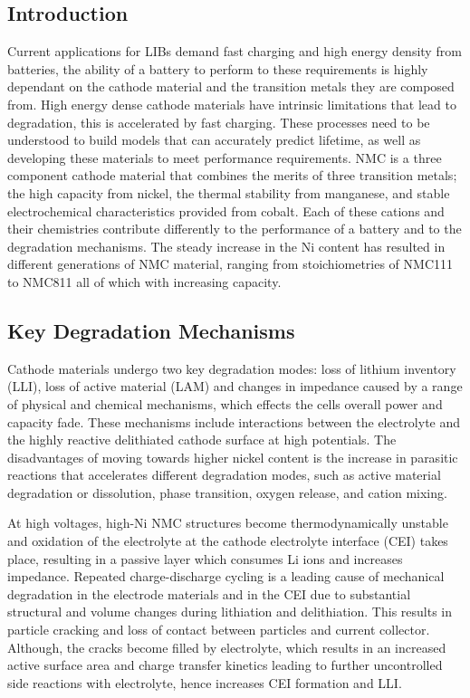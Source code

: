 \documentclass[aps,prb,twocolumn,superscriptaddress,reprint]{revtex4-1}
\begin{document}
\subsection{Introduction}
Current applications for LIBs demand fast charging and high energy density from batteries, the ability of a battery to perform to these requirements is highly dependant on the cathode material and the transition metals they are composed from.\cite{Sari2019, Julien2014} High energy dense cathode materials have intrinsic limitations that lead to degradation, this is accelerated by fast charging.\cite{Xia2018} These processes need to be understood to build  models that can accurately predict lifetime, as well as developing these materials to meet performance requirements.\cite{Hendricks2015} NMC is a three component cathode material that combines the merits of three transition metals; the high capacity from nickel, the thermal stability from manganese, and stable electrochemical characteristics provided from cobalt. Each of these cations and their chemistries contribute differently to the performance of a battery and to the degradation mechanisms.\cite{Julien2014}
The steady increase in the Ni content has resulted in different generations of NMC material, ranging from stoichiometries of NMC111 to NMC811 all of which with increasing capacity.\cite{Sari2019} 

\subsection{Key Degradation Mechanisms}
Cathode materials undergo two key degradation modes: loss of lithium inventory (LLI), loss of active material (LAM) and changes in impedance caused by a range of physical and chemical mechanisms, which effects the cells overall power and capacity fade. These mechanisms include interactions between the electrolyte and the highly reactive delithiated cathode surface at high potentials. The disadvantages of moving towards higher nickel content is the increase in parasitic reactions that accelerates different degradation modes,  such as active material degradation or dissolution, phase transition, oxygen release, and cation mixing.\cite{Dixit2017}     


At high voltages, high-Ni NMC structures become thermodynamically unstable and oxidation of the electrolyte at the cathode electrolyte interface (CEI) takes place, resulting in a passive layer which consumes Li ions and increases impedance. Repeated charge-discharge cycling is a leading cause of mechanical degradation in the electrode materials and in the CEI due to substantial structural and volume changes during lithiation and delithiation. This results in particle cracking \cite{Woodford2010} and loss of contact between particles and current collector.\cite{erickson2017recent} Although, the cracks become filled by electrolyte, which results in an increased active surface area and charge transfer kinetics leading to further uncontrolled side reactions with electrolyte, hence increases CEI formation and LLI.\cite{erickson2017recent}
\end{document}

